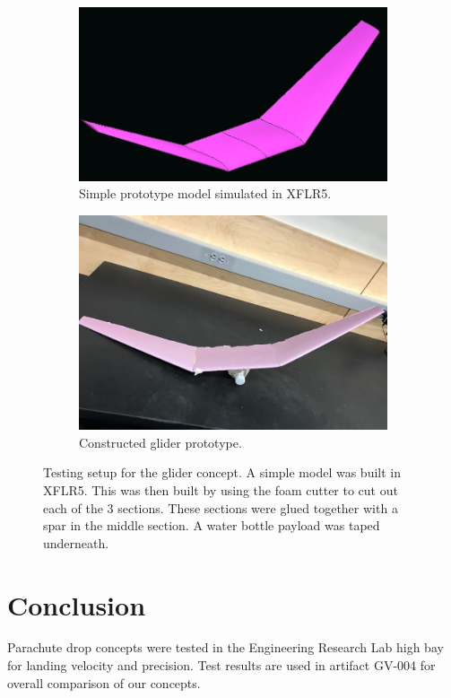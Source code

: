 \documentclass[]{auvsi_doc}
\begin{document}
\begin{figure}[h!]
	\centering
	\begin{subfigure}{0.49\linewidth} \centering
		\includegraphics[width=.95\columnwidth]{glider1.jpg}
		\caption{Simple prototype model simulated in XFLR5.}
		\label{fig:glidermodel}
	\end{subfigure}
	\begin{subfigure}{0.49\linewidth} \centering
		\includegraphics[width=.95\columnwidth]{glider2.jpg}
		\caption{Constructed glider prototype.}
		\label{fig:glider}
	\end{subfigure}
	\caption{Testing setup for the glider concept. A simple model was built in XFLR5. This was then built by using the foam cutter to cut out each of the 3 sections. These sections were glued together with a spar in the middle section. A water bottle payload was taped underneath.}
	\label{fig:combined}
\end{figure}

\newpage

\section{Conclusion}
Parachute drop concepts were tested in the Engineering Research Lab high bay for landing velocity and precision. Test results are used in artifact GV-004 for overall comparison of our concepts.
\end{document}
